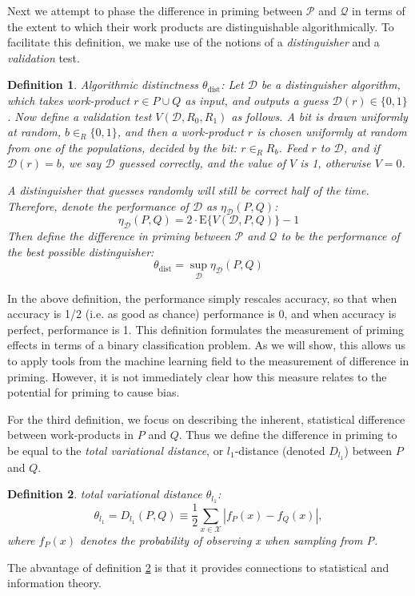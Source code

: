 \documentclass[12pt]{article}
\newtheorem{mydef}{Definition}
\begin{document}
Next we attempt to phase the difference in priming between $\mathcal{P}$ and
$\mathcal{Q}$ in terms of the extent to which their work products are 
distinguishable algorithmically. To facilitate this definition, we make 
use of the notions of a \textit{distinguisher} and a \textit{validation} test.
\begin{mydef}
	{\upshape Algorithmic distinctness $\theta_\mathrm{dist}$:}
	Let $\mathcal{D}$ be a distinguisher algorithm, which takes work-product 
	$r \in P \cup Q$ as input, and outputs a \emph{guess} 
	$\mathcal{D}(r) \in \{0, 1\}$. Now define a validation test 
	$V(\mathcal{D}, R_0, R_1)$ as follows. A bit is drawn uniformly at random, 
	$b \in_R \{0, 1\}$, and then a work-product $r$ is chosen uniformly at 
	random from one of the populations, decided by the bit: $r \in_R R_b$. 
	Feed $r$ to $\mathcal{D}$, and if $\mathcal{D}(r) = b$, we say 
	$\mathcal{D}$ guessed correctly, and the value of $V$ is 1, 
	otherwise $V = 0$.

	A distinguisher that guesses randomly will still be correct half of the 
	time. Therefore, denote the performance of $\mathcal{D}$ as 
	$\eta_\mathcal{D}(P, Q)$:
	$$
		\eta_\mathcal{D}(P,Q) = 2\cdot \mathrm{E}\{V(\mathcal{D},P,Q)\} - 1
	$$
	Then define the difference in priming between $\mathcal{P}$ and 
	$\mathcal{Q}$ to be the performance of the best possible distinguisher:
	$$ 
		\theta_\mathrm{dist} = \sup_\mathcal{D} \eta_\mathcal{D}(P,Q)
	$$
\end{mydef}
In the above definition, the performance simply rescales accuracy, so that when
accuracy is 1/2 (i.e. as good as chance) performance is 0, and when accuracy 
is perfect, performance is 1. This definition formulates the measurement of 
priming effects in terms of a binary classification problem. As we will show,
this allows us to apply tools from the machine learning field to the 
measurement of difference in priming.  However, it is not immediately clear 
how this measure relates to the potential for priming to cause bias.

For the third definition, we focus on describing the inherent, statistical
difference between work-products in $P$ and $Q$. Thus we define the difference
in priming to be equal to the \textit{total variational distance}, or $l_1$-distance (denoted $D_{l_1}$) between $P$ and $Q$. 
\begin{mydef}
	\label{def:l1}
	{\upshape total variational distance $\theta_{l_1}$:}
	$$
	\theta_{l_1} = D_{l_1}(P,Q) \equiv \frac{1}{2} \sum_{x \in \mathcal{X}} 
	\left| 
		f_P(x) - f_Q(x)
	\right|,
	$$
	where $f_P(x)$ denotes the probability of observing x when sampling from P.
\end{mydef}
The abvantage of definition \ref{def:l1} is that it provides connections
to statistical and information theory.
\end{document}
